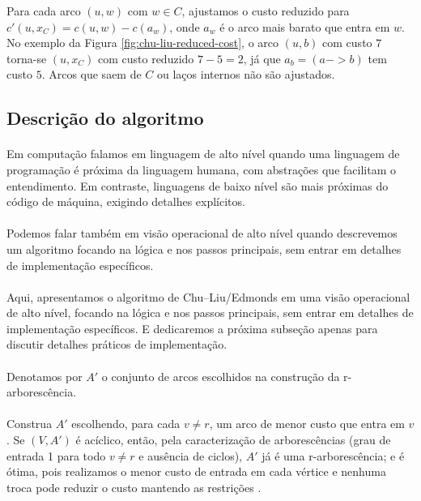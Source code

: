 \documentclass[12pt,a4paper]{article}
\def\emph#1{#1}%
\def\to{->}%
\begin{document}
Para cada arco \((u,w)\) com \(w\in C\), ajustamos o custo reduzido para \(c'(u,x_C)=c(u,w)-c(a_w)\), onde \(a_w\) é o arco mais barato que entra em \(w\). No exemplo da Figura \ref{fig:chu-liu-reduced-cost}, o arco \((u,b)\) com custo \(7\) torna-se \((u,x_C)\) com custo reduzido \(7-5=2\), já que \(a_b=(a\to b)\) tem custo \(5\). Arcos que saem de \(C\) ou laços internos não são ajustados.

\subsection{Descrição do algoritmo}

\paragraph{}
Em computação falamos em linguagem de alto nível quando uma linguagem de programação é próxima da linguagem humana, com abstrações que facilitam o entendimento. Em contraste, linguagens de baixo nível são mais próximas do código de máquina, exigindo detalhes explícitos.

\paragraph{}
Podemos falar também em visão operacional de alto nível quando descrevemos um algoritmo focando na lógica e nos passos principais, sem entrar em detalhes de implementação específicos.

\paragraph{}
Aqui, apresentamos o algoritmo de Chu–Liu/Edmonds em uma visão operacional de alto nível, focando na lógica e nos passos principais, sem entrar em detalhes de implementação específicos. E dedicaremos a próxima subseção apenas para discutir detalhes práticos de implementação.

\paragraph{}
Denotamos por \(A'\) o conjunto de arcos escolhidos na construção da r-arborescência.

\paragraph{}
Construa \(A'\) escolhendo, para cada \(v\neq r\), um arco de menor custo que \emph{entra} em \(v\). Se \((V,A')\) é acíclico, então, pela caracterização de arborescências (grau de entrada 1 para todo \(v\neq r\) e ausência de ciclos), \(A'\) já é uma r-arborescência; e é \emph{ótima}, pois realizamos o menor custo de entrada em cada vértice e nenhuma troca pode reduzir o custo mantendo as restrições \cite[Sec.~4.9]{kleinberg2006}.
\end{document}
